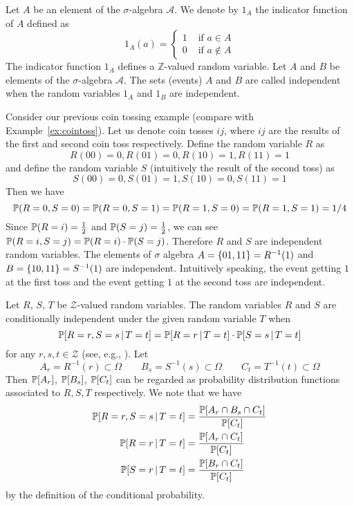Let $A$ be an element of the $\sigma$-algebra ${\mathcal A}$.
We denote by $1_A$ the indicator function of $A$ defined as
\[
  1_A(a) = \begin{cases}
    1 & \text{ if } a \in A \\
    0 & \text{ if } a \not\in A
  \end{cases}
\]
The indicator function $1_A$ defines a ${\mathbb Z}$-valued random variable.
Let $A$ and $B$ be elements of the $\sigma$-algebra ${\mathcal A}$.
The sets (events) $A$ and $B$ are called independent
when the random variables $1_A$ and $1_B$ are independent.

\begin{example}
  Consider our previous coin tossing example (compare with Example~\ref{ex:cointoss}).
  Let us denote coin tosses $ij$, where $ij$ are the results of the first and second coin toss respectively.
  Define the random variable $R$ as
  \[ R(00)=0, R(01)=0, R(10)=1, R(11)=1 \]
  and define the random variable $S$ (intuitively the result of the second toss) as
  \[ S(00)=0, S(01)=1, S(10)=0, S(11)=1 \]
  Then we have
  \[
    \mathbb P(R=0, S=0) = 
    \mathbb P(R=0, S=1) = 
    \mathbb P(R=1, S=0) = 
    \mathbb P(R=1, S=1) = 1/4
  \]
  Since $\mathbb P(R=i) = \frac12$ and $\mathbb P(S=j) = \frac12$,
  we can see $\mathbb P(R=i, S=j) = \mathbb P(R=i) \cdot \mathbb P(S=j)$.
  Therefore $R$ and $S$ are independent random variables.
  The elements of $\sigma$ algebra
  $A = \left\{01, 11\right\} = R^{-1}(1)$ and $B = \left\{10, 11\right\} = S^{-1}(1)$
  are independent.
  Intuitively speaking, the event getting $1$ at the first toss
  and the event getting $1$ at the second toss
  are independent.
\end{example}

Let $R$, $S$, $T$ be $\mathcal Z$-valued random variables.
The random variables $R$ and $S$ are conditionally independent under the given random variable $T$
when
\[
  \mathbb P[R=r, S=s\,|\,T=t] =
  \mathbb P[R=r\,|\,T=t] \cdot \mathbb P[S=s\,|\,T=t]
\]
for any $r, s, t \in \mathcal Z$ (see, e.g., \cite[3.1]{dawid}).
Let
\[
  A_r = R^{-1}(r) \subset \Omega \qquad
  B_s = S^{-1}(s) \subset \Omega \qquad
  C_t = T^{-1}(t) \subset \Omega
\]
Then $\mathbb P[A_r]$, $\mathbb P[B_s]$, $\mathbb P[C_t]$ can be regarded as probability distribution functions associated to $R, S, T$ respectively.
We note that we have
\begin{align*}
  \mathbb P[R=r, S=s\,|\,T=t] &= \frac{\mathbb P[A_r \cap B_s \cap C_t]}{\mathbb P[C_t]} \\
  \mathbb P[R=r\,|\,T=t] &= \frac{\mathbb P[A_r \cap C_t]}{\mathbb P[C_t]} \\
  \mathbb P[S=r\,|\,T=t] &= \frac{\mathbb P[B_r \cap C_t]}{\mathbb P[C_t]}
\end{align*}
by the definition of the conditional probability.

